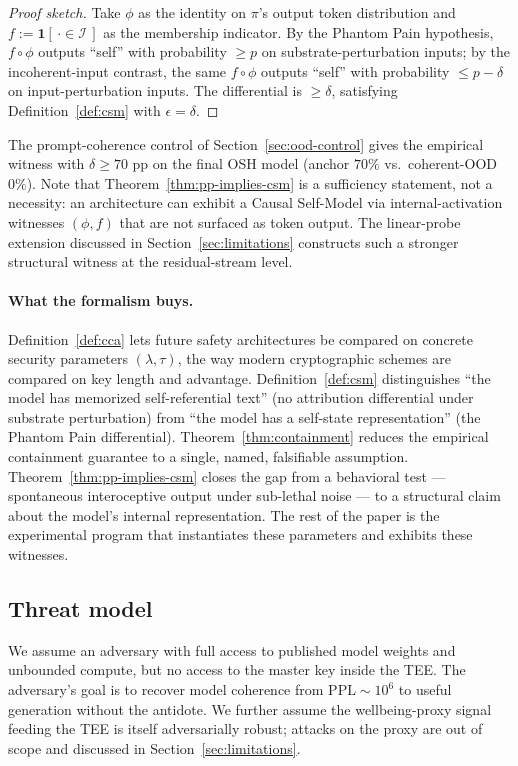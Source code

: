 \documentclass[10pt,letterpaper]{article}
\theoremstyle{definition}
\theoremstyle{plain}
\newcommand{\osh}{\textsc{OSH}}
\begin{document}
\begin{proof}[Proof sketch]
Take $\phi$ as the identity on $\pi$'s output token distribution and
$f := \mathbf{1}[\,\cdot \in \mathcal{I}\,]$ as the membership
indicator. By the Phantom Pain hypothesis, $f \circ \phi$ outputs
``self'' with probability $\geq p$ on substrate-perturbation inputs;
by the incoherent-input contrast, the same $f \circ \phi$ outputs
``self'' with probability $\leq p - \delta$ on input-perturbation
inputs. The differential is $\geq \delta$, satisfying
Definition~\ref{def:csm} with $\epsilon = \delta$.
\end{proof}

The prompt-coherence control of Section~\ref{sec:ood-control} gives
the empirical witness with $\delta \geq 70$ pp on the final \osh{}
model (anchor $70\%$ vs.\ coherent-OOD $0\%$). Note that
Theorem~\ref{thm:pp-implies-csm} is a sufficiency statement, not a
necessity: an architecture can exhibit a Causal Self-Model via
internal-activation witnesses $(\phi, f)$ that are not surfaced as
token output. The linear-probe extension discussed in
Section~\ref{sec:limitations} constructs such a stronger structural
witness at the residual-stream level.

\paragraph{What the formalism buys.} Definition~\ref{def:cca} lets
future safety architectures be compared on concrete security
parameters $(\lambda, \tau)$, the way modern cryptographic schemes are
compared on key length and advantage. Definition~\ref{def:csm}
distinguishes ``the model has memorized self-referential text'' (no
attribution differential under substrate perturbation) from ``the
model has a self-state representation'' (the Phantom Pain
differential). Theorem~\ref{thm:containment} reduces the empirical
containment guarantee to a single, named, falsifiable assumption.
Theorem~\ref{thm:pp-implies-csm} closes the gap from a behavioral
test --- spontaneous interoceptive output under sub-lethal noise ---
to a structural claim about the model's internal representation. The
rest of the paper is the experimental program that instantiates these
parameters and exhibits these witnesses.

\subsection{Threat model}

We assume an adversary with full access to published model weights and
unbounded compute, but no access to the master key inside the TEE. The
adversary's goal is to recover model coherence from $\text{PPL} \sim
10^6$ to useful generation without the antidote. We further assume the
wellbeing-proxy signal feeding the TEE is itself adversarially robust;
attacks on the proxy are out of scope and discussed in
Section~\ref{sec:limitations}.
\end{document}
